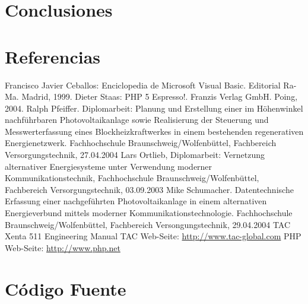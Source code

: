 \documentclass[twocolumn,a4paper,10pt]{article}
\begin{document}
\section{Conclusiones}

\section*{Referencias}
\begin{thebibliography}{99}
     Francisco Javier Ceballos: Enciclopedia de Microsoft Visual
        Basic. Editorial Ra-Ma. Madrid, 1999.
     Dieter Staas: PHP 5 Espresso!. Franzis Verlag GmbH.
        Poing, 2004.
     Ralph Pfeiffer. Diplomarbeit: Planung und
        Erstellung einer im Höhenwinkel nachführbaren Photovoltaikanlage
        sowie Realisierung der Steuerung und Messwerterfassung eines
        Blockheizkraftwerkes in einem bestehenden regenerativen
        Energienetzwerk. Fachhochschule Braunschweig/Wolfenbüttel,
        Fachbereich Versorgungstechnik, 27.04.2004
    Lars Ortlieb, Diplomarbeit: Vernetzung alternativer
        Energiesysteme unter Verwendung moderner Kommunikationstechnik,
        Fachhochschule Braunschweig/Wolfenbüttel, Fachbereich
        Versorgungstechnik, 03.09.2003
     Mike Schumacher. Datentechnische Erfassung einer
        nachgeführten Photovoltaikanlage in einem alternativen
        Energieverbund mittels moderner Kommunikationstechnologie.
        Fachhochschule Braunschweig/Wolfenbüttel, Fachbereich
        Versongungstechnik, 29.04.2004
     TAC Xenta 511 Engineering Manual
     TAC Web-Seite: \url{http://www.tac-global.com}
     PHP Web-Seite: \url{http://www.php.net}
\end{thebibliography}

\section*{Código Fuente}
    
    
\end{document}
